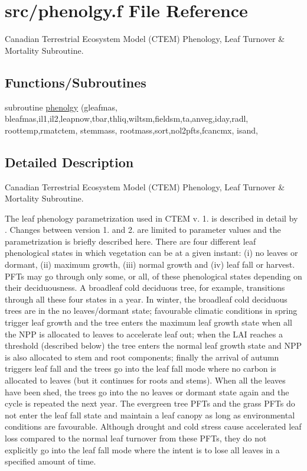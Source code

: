 \hypertarget{phenolgy_8f}{}\section{src/phenolgy.f File Reference}
\label{phenolgy_8f}


Canadian Terrestrial Ecosystem Model (C\+T\+E\+M) Phenology, Leaf Turnover \& Mortality Subroutine.  


\subsection*{Functions/\+Subroutines}
\begin{DoxyCompactItemize}
\item 
subroutine \hyperlink{phenolgy_8f_add1d849abdf1b6baf10cfdde1b93ec0b}{phenolgy} (gleafmas, bleafmas,il1,il2,leapnow,tbar,thliq,wiltsm,fieldsm,ta,anveg,iday,radl, roottemp,rmatctem, stemmass, rootmass,sort,nol2pfts,fcancmx, isand,
\end{DoxyCompactItemize}


\subsection{Detailed Description}
Canadian Terrestrial Ecosystem Model (C\+T\+E\+M) Phenology, Leaf Turnover \& Mortality Subroutine. 

The leaf phenology parametrization used in C\+T\+E\+M v. 1. is described in detail by \cite{Arora2005-6b1}. Changes between version 1. and 2. are limited to parameter values and the parametrization is briefly described here. There are four different leaf phenological states in which vegetation can be at a given instant\+: (i) no leaves or dormant, (ii) maximum growth, (iii) normal growth and (iv) leaf fall or harvest. P\+F\+Ts may go through only some, or all, of these phenological states depending on their deciduousness. A broadleaf cold deciduous tree, for example, transitions through all these four states in a year. In winter, the broadleaf cold deciduous trees are in the no leaves/dormant state; favourable climatic conditions in spring trigger leaf growth and the tree enters the maximum leaf growth state when all the N\+P\+P is allocated to leaves to accelerate leaf out; when the L\+A\+I reaches a threshold (described below) the tree enters the normal leaf growth state and N\+P\+P is also allocated to stem and root components; finally the arrival of autumn triggers leaf fall and the trees go into the leaf fall mode where no carbon is allocated to leaves (but it continues for roots and stems). When all the leaves have been shed, the trees go into the no leaves or dormant state again and the cycle is repeated the next year. The evergreen tree P\+F\+Ts and the grass P\+F\+Ts do not enter the leaf fall state and maintain a leaf canopy as long as environmental conditions are favourable. Although drought and cold stress cause accelerated leaf loss compared to the normal leaf turnover from these P\+F\+Ts, they do not explicitly go into the leaf fall mode where the intent is to lose all leaves in a specified amount of time.

